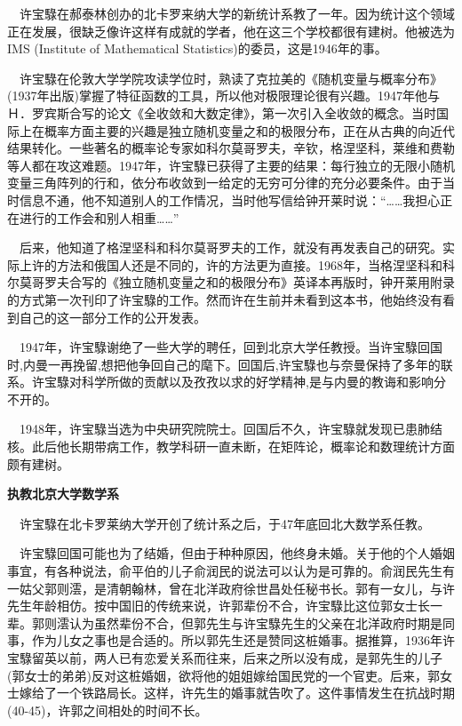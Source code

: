 \begin{frame}
	$\quad$许宝騄在郝泰林创办的北卡罗来纳大学的新统计系教了一年。因为统计这个领域正在发展，很缺乏像许这样有成就的学者，他在这三个学校都很有建树。他被选为IMS (Institute of Mathematical Statistics)的委员，这是1946年的事。
	
	$\quad$许宝騄在伦敦大学学院攻读学位时，熟读了克拉美的《随机变量与概率分布》(1937年出版)掌握了特征函数的工具，所以他对极限理论很有兴趣。1947年他与Ｈ．罗宾斯合写的论文《全收敛和大数定律》，第一次引入全收敛的概念。当时国际上在概率方面主要的兴趣是独立随机变量之和的极限分布，正在从古典的向近代结果转化。一些著名的概率论专家如科尔莫哥罗夫，辛钦，格涅坚科，莱维和费勒等人都在攻这难题。1947年，许宝騄已获得了主要的结果：每行独立的无限小随机变量三角阵列的行和，依分布收敛到一给定的无穷可分律的充分必要条件。由于当时信息不通，他不知道别人的工作情况，当时他写信给钟开莱时说：“……我担心正在进行的工作会和别人相重……”
\end{frame}

\begin{frame}
	$\quad$后来，他知道了格涅坚科和科尔莫哥罗夫的工作，就没有再发表自己的研究。实际上许的方法和俄国人还是不同的，许的方法更为直接。1968年，当格涅坚科和科尔莫哥罗夫合写的《独立随机变量之和的极限分布》英译本再版时，钟开莱用附录的方式第一次刊印了许宝騄的工作。然而许在生前并未看到这本书，他始终没有看到自己的这一部分工作的公开发表。
	
	$\quad$1947年，许宝騄谢绝了一些大学的聘任，回到北京大学任教授。当许宝騄回国时,内曼一再挽留,想把他争回自己的麾下。回国后,许宝騄也与奈曼保持了多年的联系。许宝騄对科学所做的贡献以及孜孜以求的好学精神,是与内曼的教诲和影响分不开的。
	
	$\quad$1948年，许宝騄当选为中央研究院院士。回国后不久，许宝騄就发现已患肺结核。此后他长期带病工作，教学科研一直未断，在矩阵论，概率论和数理统计方面颇有建树。
	
\end{frame}

\begin{frame}
	\textbf{执教北京大学数学系}
	
	$\quad$许宝騄在北卡罗莱纳大学开创了统计系之后，于47年底回北大数学系任教。
	
	$\quad$许宝騄回国可能也为了结婚，但由于种种原因，他终身未婚。关于他的个人婚姻事宜，有各种说法，俞平伯的儿子俞润民的说法可以认为是可靠的。俞润民先生有一姑父郭则澐，是清朝翰林，曾在北洋政府徐世昌处任秘书长。郭有一女儿，与许先生年龄相仿。按中国旧的传统来说，许郭辈份不合，许宝騄比这位郭女士长一辈。郭则澐认为虽然辈份不合，但郭先生与许宝騄先生的父亲在北洋政府时期是同事，作为儿女之事也是合适的。所以郭先生还是赞同这桩婚事。据推算，1936年许宝騄留英以前，两人已有恋爱关系而往来，后来之所以没有成，是郭先生的儿子(郭女士的弟弟)反对这桩婚姻，欲将他的姐姐嫁给国民党的一个官吏。后来，郭女士嫁给了一个铁路局长。这样，许先生的婚事就告吹了。这件事情发生在抗战时期(40-45)，许郭之间相处的时间不长。
	
\end{frame}

